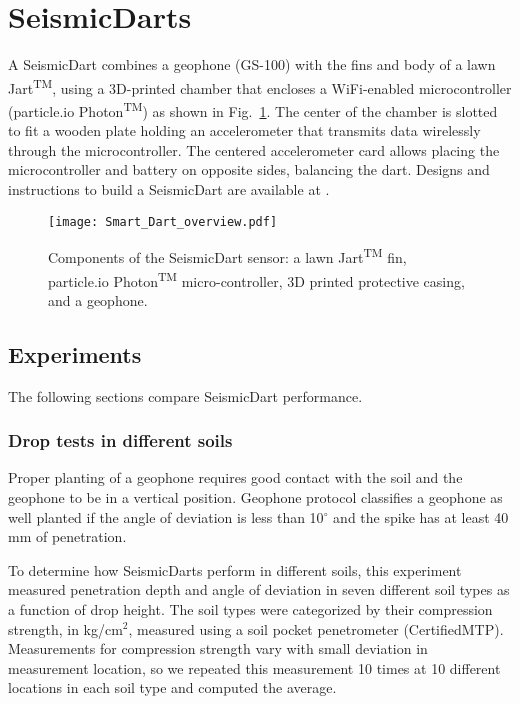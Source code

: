 \section{SeismicDarts}\label{sec:SeismicDarts}

A SeismicDart combines a geophone (GS-100) with the fins and body of a lawn Jart\textsuperscript{TM}, using a 3D-printed chamber that encloses a WiFi-enabled microcontroller (particle.io Photon\textsuperscript{TM}) as shown in Fig.~\ref{fig:Smart_Dart_overview}. 
The center of the chamber is slotted to fit a wooden plate holding an accelerometer that transmits data wirelessly through the microcontroller. 
The centered accelerometer card allows placing the microcontroller and battery on opposite sides, balancing the dart.
Designs and instructions to build a SeismicDart are available at \cite{Victor2016Thingiverse}.



\begin{figure} \centering
{\texttt{[image: Smart\_Dart\_overview.pdf]}}
\caption{Components of the SeismicDart sensor: a lawn  Jart\textsuperscript{TM} fin, particle.io Photon\textsuperscript{TM}  micro-controller, 3D printed protective casing, and a geophone.} 
\label{fig:Smart_Dart_overview}
\end{figure}

\subsection{Experiments} 
The following sections compare SeismicDart performance.
\subsubsection{ Drop tests in different soils}  


Proper planting of a geophone requires good contact with the soil and the geophone to be in a vertical position. 
Geophone protocol classifies a geophone as well planted if the angle of deviation is less than 10$^\circ$ and the spike has at least 40 mm of penetration.

To determine how SeismicDarts perform in different soils, this experiment measured penetration depth and angle of deviation in seven different soil types as a function of drop height. 
 The soil types were categorized by their compression strength, in kg/cm$^2$, measured using a soil pocket penetrometer (CertifiedMTP). Measurements for compression strength vary with small deviation in measurement location, so we repeated this measurement 10 times at 10 different locations in each soil type and computed the average.
 

